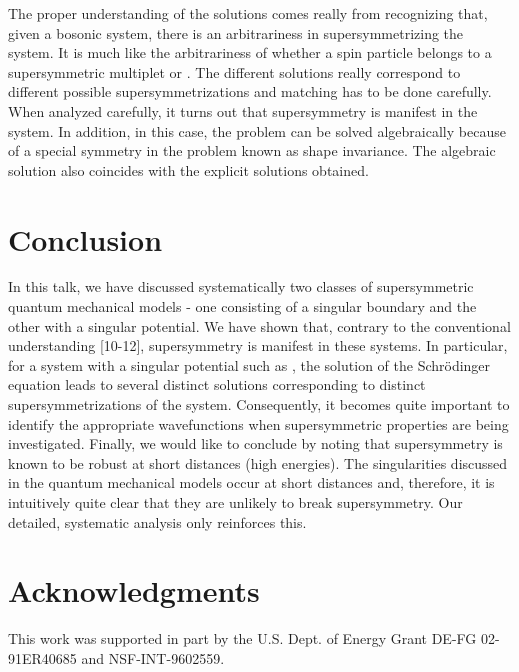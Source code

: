 \documentclass[a4paper,11pt]{article}
\begin{document}
The proper understanding of the solutions comes really from
recognizing that, given a bosonic system, there is an arbitrariness in
supersymmetrizing the system. It is much like the arbitrariness of
whether a spin \coordHE{} particle belongs to a supersymmetric
multiplet \coordHE{} or \coordHE{}. The different
solutions really correspond to different possible supersymmetrizations
and matching has to be done carefully. When analyzed carefully, it
turns out that supersymmetry is manifest in the system. In addition,
in this case, the problem can be solved algebraically because of a
special symmetry in the problem known as shape invariance. The
algebraic solution also coincides with the explicit solutions obtained. 


\section{Conclusion}
In this talk, we have discussed systematically two classes of
supersymmetric quantum  mechanical models - one consisting of a
singular boundary and the other with a singular potential. We have
shown that, contrary to the conventional understanding [10-12], supersymmetry
is manifest in these systems. In particular, for a system with a
singular potential such as \coordHE{},  the
solution of the Schr\"{o}dinger equation leads to several distinct
solutions corresponding to distinct supersymmetrizations of the
system. Consequently, it becomes quite important to identify the
appropriate wavefunctions when supersymmetric properties are being
investigated. Finally, we would like to conclude by noting that
supersymmetry is known to be robust at short distances (high
energies). The singularities discussed in the quantum mechanical
models occur at short distances  and, therefore, it is intuitively quite
clear that they are unlikely to break supersymmetry. Our detailed,
systematic analysis only reinforces this.    

\section*{Acknowledgments}


This work was supported in part by the U.S. Dept. of
Energy Grant  DE-FG 02-91ER40685 and NSF-INT-9602559.
 
\end{document}
